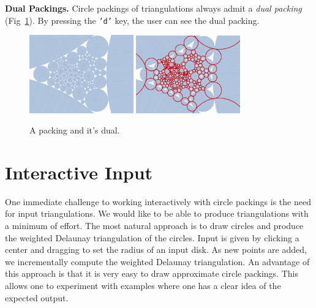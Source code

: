 \documentclass[a4paper,UKenglish]{lipics}
\begin{document}
  \textbf{Dual Packings.} %
  \label{sub:dual_packings}
    Circle packings of triangulations always admit a \emph{dual packing} (Fig~\ref{fig:primal_dual}).
    By pressing the \texttt{'d'} key, the user can see the dual packing.
    \begin{figure}[ht]
      \centering
        \includegraphics[width = 0.40\textwidth]{figures/primal.png}
        \includegraphics[width = 0.40\textwidth]{figures/dual.png}
      \caption{A packing and it's dual.}
      \label{fig:primal_dual}
    \end{figure}
  
  


\section{Interactive Input} %
\label{sec:interactive_input}

  One immediate challenge to working interactively with circle packings is the need for input triangulations.
  We would like to be able to produce triangulations with a minimum of effort.  
  The most natural approach is to draw circles and produce the weighted Delaunay triangulation of the circles.
  Input is given by clicking a center and dragging to set the radius of an input disk.
  As new points are added, we incrementally compute the weighted Delaunay triangulation.
  An advantage of this approach is that it is very easy to draw approximate circle packings.  
  This allows one to experiment with examples where one has a clear idea of the expected output.
\end{document}
